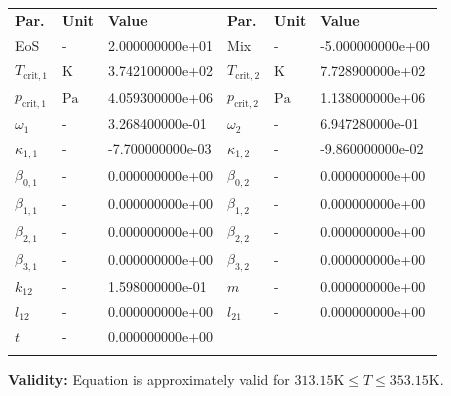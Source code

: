\begin{longtable}[l]{lll|lll}
\toprule
\addlinespace
\textbf{Par.} & \textbf{Unit} & \textbf{Value} &	\textbf{Par.} & \textbf{Unit} & \textbf{Value} \\
\addlinespace
\midrule
\endhead

\bottomrule
\endfoot
\bottomrule
\endlastfoot
\addlinespace

EoS & - & 2.000000000e+01 & Mix & - & -5.000000000e+00 \\
$T_\mathrm{crit,1}$ & $\si{\kelvin}$ & 3.742100000e+02 & $T_\mathrm{crit,2}$ & $\si{\kelvin}$ & 7.728900000e+02 \\
$p_\mathrm{crit,1}$ & $\si{\pascal}$ & 4.059300000e+06 & $p_\mathrm{crit,2}$ & $\si{\pascal}$ & 1.138000000e+06 \\
$\omega_{1}$ & - & 3.268400000e-01 & $\omega_{2}$ & - & 6.947280000e-01 \\
$\kappa_{1,1}$ & - & -7.700000000e-03 & $\kappa_{1,2}$ & - & -9.860000000e-02 \\
$\beta_{0,1}$ & - & 0.000000000e+00 & $\beta_{0,2}$ & - & 0.000000000e+00 \\
$\beta_{1,1}$ & - & 0.000000000e+00 & $\beta_{1,2}$ & - & 0.000000000e+00 \\
$\beta_{2,1}$ & - & 0.000000000e+00 & $\beta_{2,2}$ & - & 0.000000000e+00 \\
$\beta_{3,1}$ & - & 0.000000000e+00 & $\beta_{3,2}$ & - & 0.000000000e+00 \\
$k_{12}$ & - & 1.598000000e-01 & $m$ & - & 0.000000000e+00 \\
$l_{12}$ & - & 0.000000000e+00 & $l_{21}$ & - & 0.000000000e+00 \\
$t$ & - & 0.000000000e+00 & & & \\

\addlinespace\end{longtable}

\textbf{Validity:}
\newline
Equation is approximately valid for $313.15 \si{\kelvin} \leq T \leq 353.15 \si{\kelvin}$.
\newline

